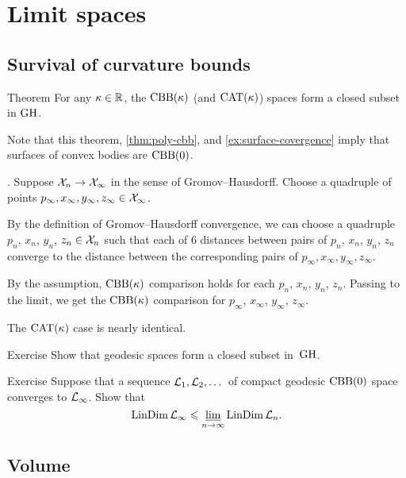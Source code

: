 \chapter{Limit spaces}


\section{Survival of curvature bounds}

\begin{thm}{Theorem}\label{thm:CBB-closed}
For any $\kappa\in\mathbb{R}$, the $\mathrm{CBB}(\kappa)$ (and $\mathrm{CAT}(\kappa)$) spaces form a closed subset in $\operatorname{\rm GH}\nolimits$.
\end{thm}


Note that this theorem, \ref{thm:poly-cbb}, and \ref{ex:surface-covergence} imply that surfaces of convex bodies are $\mathrm{CBB}(0)$.

.
Suppose $\mathcal{X}_n\to\mathcal{X}_\infty$ in the sense of Gromov--Hausdorff.
Choose a quadruple of points $p_\infty, x_\infty,y_\infty,z_\infty\in \mathcal{X}_\infty$.

By the definition of Gromov--Hausdorff convergence, we can choose a quadruple $p_n$,  $x_n$, $y_n$, $z_n\in \mathcal{X}_n$ such that each of 6 distances between pairs of $p_n$, $x_n$, $y_n$, $z_n$ converge to the distance between the corresponding pairs of $p_\infty, x_\infty,y_\infty,z_\infty$.

By the assumption, $\mathrm{CBB}(\kappa)$ comparison holds for each $p_n$, $x_n$, $y_n$, $z_n$.
Passing to the limit, we get the $\mathrm{CBB}(\kappa)$ comparison for $p_\infty$,  $x_\infty$, $y_\infty$, $z_\infty$.

The $\mathrm{CAT}(\kappa)$ case is nearly identical.
\qeds

\begin{thm}{Exercise}\label{ex:geod-closed}
Show that geodesic spaces form a closed subset in~$\operatorname{\rm GH}\nolimits$.
\end{thm}


\begin{thm}{Exercise}\label{ex:dim-lim}
Suppose that a sequence $\mathcal{L}_1,\mathcal{L}_2,\dots$ of compact geodesic $\mathrm{CBB}(0)$ space converges to $\mathcal{L}_\infty$.
Show that
\[\mathop{\rm LinDim}\nolimits \mathcal{L}_\infty\leqslant \varliminf_{n\to\infty} \mathop{\rm LinDim}\nolimits \mathcal{L}_n.\]
\end{thm}


\section{Volume}

